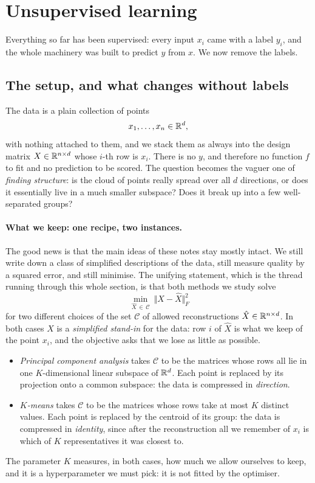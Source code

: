 \section{Unsupervised learning}
\label{sec:unsupervised}

Everything so far has been supervised: every input $x_i$ came with a label $y_i$, and
the whole machinery was built to predict $y$ from $x$. We now remove the labels.

\subsection{The setup, and what changes without labels}
\label{subsec:unsup-setup}

The data is a plain collection of points
\[
x_1, \dots, x_n \in \mathbb{R}^d ,
\]
with nothing attached to them, and we stack them as always into the design matrix
$X \in \mathbb{R}^{n \times d}$ whose $i$-th row is $x_i$. There is no $y$, and therefore
no function $f$ to fit and no prediction to be scored. The question becomes the vaguer
one of \emph{finding structure}: is the cloud of points really spread over all $d$
directions, or does it essentially live in a much smaller subspace? Does it break up
into a few well-separated groups?

\paragraph{What we keep: one recipe, two instances.}
The good news is that the main ideas of these notes stay mostly intact. We still
write down a class of simplified descriptions of the data, still measure quality by a
squared error, and still minimise. The unifying statement, which is the thread running
through this whole section, is that both methods we study solve
\[
\ \min_{\hat X \,\in\, \mathcal{C}} \ \big\Vert X - \hat X \big\Vert_F^2 
\]
for two different choices of the set $\mathcal{C}$ of allowed reconstructions
$\hat X \in \mathbb{R}^{n \times d}$. In both cases $\hat X$ is a \emph{simplified stand-in}
for the data: row $i$ of $\hat X$ is what we keep of the point $x_i$, and the objective
asks that we lose as little as possible.
\begin{itemize}
    \item \emph{Principal component analysis} takes $\mathcal{C}$ to be the matrices
    whose rows all lie in one $K$-dimensional linear subspace of $\mathbb{R}^d$. Each point is
    replaced by its projection onto a common subspace: the data is compressed in
    \emph{direction}.
    \item \emph{$K$-means} takes $\mathcal{C}$ to be the matrices whose rows take at
    most $K$ distinct values. Each point is replaced by the centroid of its group: the
    data is compressed in \emph{identity}, since after the reconstruction all we
    remember of $x_i$ is which of $K$ representatives it was closest to.
\end{itemize}
The parameter $K$ measures, in both cases, how much we allow ourselves to keep, and it
is a hyperparameter we must pick: it is not fitted by the
optimiser.

